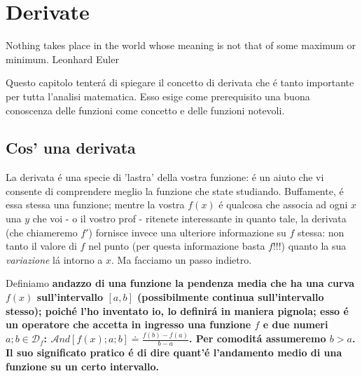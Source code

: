 \label{derivate}
\chapter{Derivate}

\citazioneinizioparagrafo
  {Nothing takes place in the world whose meaning is not that of some maximum or minimum.}
  {Leonhard Euler}

Questo capitolo tenter\'a di spiegare il concetto di derivata che \'e tanto importante per tutta l'analisi matematica.
Esso esige come prerequisito una buona conoscenza delle funzioni come concetto e delle funzioni notevoli.

\section{Cos' \egrave una derivata}

La derivata \'e una specie di 'lastra' della vostra funzione: \'e un aiuto che vi consente di comprendere meglio la
funzione che state studiando. Buffamente, \'e essa stessa una funzione; mentre la vostra $f(x)$ \'e qualcosa che associa
ad ogni $x$ una $y$ che voi - o il vostro prof - ritenete interessante in quanto tale, la derivata (che chiameremo $f'$)
fornisce invece una ulteriore informazione su $f$ stessa: non tanto il valore di $f$ nel punto (per questa informazione
basta $f$!!!) quanto la sua {\em variazione} l\'a intorno a $x$. Ma facciamo un passo indietro.


\label{andazzo}
\begin{definizione}[Andazzo] Definiamo \bf{andazzo} di una funzione la pendenza media che ha una curva $f(x)$ sull'intervallo 
      $[a,b]$ (possibilmente continua sull'intervallo stesso); poich\'e l'ho inventato io, lo definir\'a in maniera pignola; esso
      \'e un operatore che accetta in ingresso una funzione $f$ e due numeri $a;b \in \mathcal{D}_f$: $\mathcal{A}nd[f(x);a;b] \doteq \frac{f(b)-f(a)}{b-a}$.
      Per comodit\'a assumeremo $b>a$. Il suo significato pratico \'e di dire quant'\'e
       l'andamento medio di una funzione su un certo intervallo.
\end{definizione}

